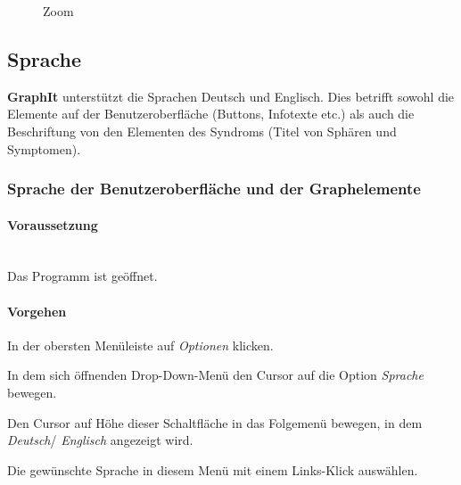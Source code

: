 \documentclass[enabledeprecatedfontcommands,fontsize=11pt,paper=a4,twoside]{scrartcl}
\newcounter{one}
\newcommand*{\condition}{\paragraph{Voraussetzung}$\;$ \vspace{0.2cm}\\}
\newcommand*{\action}{\paragraph{Vorgehen}}
\let\origenumerate\enumerate
\let\origendenumerate\endenumerate
\renewenvironment{enumerate}{\origenumerate \addtolength{\itemsep}{-10.0pt}}{\origendenumerate}
\begin{document}
 		\begin{figure}[ht!]
 			\centering
 			\caption{Zoom}
 		\end{figure}
	
\subsection{Sprache}\label{settings}
\textbf{GraphIt} unterstützt die Sprachen Deutsch und Englisch. Dies betrifft sowohl die Elemente auf der Benutzeroberfläche (Buttons, Infotexte etc.) als auch die Beschriftung von den Elementen des Syndroms (Titel von Sphären und Symptomen).\\
	
\newpage
\subsubsection{Sprache der Benutzeroberfläche und der Graphelemente}
		\condition 	
		Das Programm ist geöffnet.
		\action
		\begin{enumerate}
				\item In der obersten Menüleiste auf \textit{Optionen} klicken. 
				\item In dem sich öffnenden Drop-Down-Menü den Cursor auf die Option \textit{Sprache} bewegen.
				\item Den Cursor auf Höhe dieser Schaltfläche in das Folgemenü bewegen, in dem \textit{Deutsch}/ \textit{Englisch} angezeigt wird.
				\item Die gewünschte Sprache in diesem Menü mit einem Links-Klick auswählen.\\
		\end{enumerate}
\end{document}
